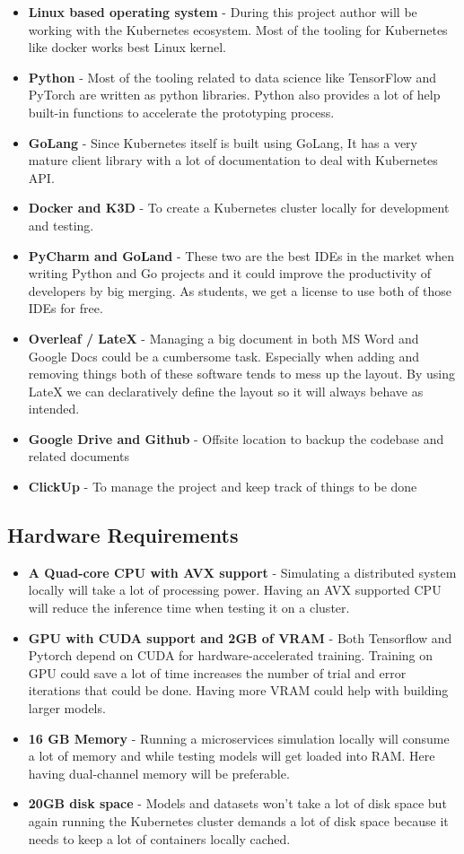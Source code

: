 \begin{itemize}
\item \textbf{Linux based operating system} - During this project author will be working with the Kubernetes ecosystem. Most of the tooling for Kubernetes like docker works best Linux kernel.
\item \textbf{Python} - Most of the tooling related to data science like TensorFlow and PyTorch are written as python libraries. Python also provides a lot of help built-in functions to  accelerate the prototyping process.
\item \textbf{GoLang} - Since Kubernetes itself is built using GoLang, It has a very mature client library with a lot of documentation to deal with Kubernetes API.
\item \textbf{Docker and K3D} - To create a Kubernetes cluster locally for development and testing.
\item \textbf{PyCharm and GoLand} - These two are the best IDEs in the market when writing Python and Go projects and it could improve the productivity of developers by big merging. As students, we get a license to use both of those IDEs for free.
\item \textbf{Overleaf / LateX}  - Managing a big document in both MS Word and Google Docs could be a cumbersome task. Especially when adding and removing things both of these software tends to mess up the layout. By using LateX we can declaratively define the layout so it will always behave as intended.
\item \textbf{Google Drive and Github} - Offsite location to backup the codebase and related documents
\item \textbf{ClickUp} - To manage the project and keep track of things to be done
\end{itemize}

\subsection{Hardware Requirements}
\begin{itemize}
    \item \textbf{A Quad-core CPU with AVX support} - Simulating a distributed system locally will take a lot of processing power. Having an AVX supported CPU will reduce the inference time when testing it on a cluster.
    \item \textbf{GPU with CUDA support and 2GB of VRAM} - Both Tensorflow and Pytorch depend on CUDA for hardware-accelerated training. Training on GPU could save a lot of time increases the number of trial and error iterations that could be done. Having more VRAM could help with building larger models.
    \item \textbf{16 GB Memory} - Running a microservices simulation locally will consume a lot of memory and while testing models will get loaded into RAM. Here having dual-channel memory will be preferable. 
    \item \textbf{20GB disk space} - Models and datasets won't take a lot of disk space but again running the Kubernetes cluster demands a lot of disk space because it needs to keep a lot of containers locally cached.
\end{itemize}

